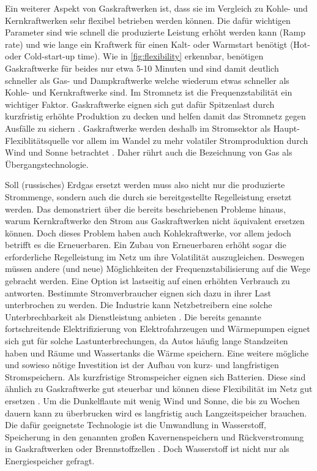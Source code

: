Ein weiterer Aspekt von Gaskraftwerken ist, dass sie im Vergleich zu Kohle- und Kernkraftwerken sehr flexibel betrieben werden können. Die dafür wichtigen Parameter sind wie schnell die produzierte Leistung erhöht werden kann (Ramp rate) und wie lange ein Kraftwerk für einen Kalt- oder Warmstart benötigt (Hot- oder Cold-start-up time). Wie in \autoref{fig:flexibility} erkennbar, benötigen Gaskraftwerke für beides nur etwa 5-10 Minuten und sind damit deutlich schneller als Gas- und Dampkraftwerke welche wiederum etwas schneller als Kohle- und Kernkraftwerke sind. Im Stromnetz ist die Frequenzstabilität ein wichtiger Faktor. Gaskraftwerke eignen sich gut dafür Spitzenlast durch kurzfristig erhöhte Produktion zu decken und helfen damit das Stromnetz gegen Ausfälle zu sichern \cite{ei1}.
Gaskraftwerke werden deshalb im Stromsektor als Haupt-Flexiblitätsquelle vor allem im Wandel zu mehr volatiler Stromproduktion durch Wind und Sonne betrachtet \cite{iea2022}. Daher rührt auch die Bezeichnung von Gas als Übergangstechnologie.

Soll (russisches) Erdgas ersetzt werden muss also nicht nur die produzierte Strommenge, sondern auch die durch sie bereitgestellte Regelleistung ersetzt werden. Das demonstriert über die bereits beschriebenen Probleme hinaus, warum Kernkraftwerke den Strom aus Gaskraftwerken nicht äquivalent ersetzen können.
Doch dieses Problem haben auch Kohlekraftwerke, vor allem jedoch betrifft es die Erneuerbaren. Ein Zubau von Erneuerbaren erhöht sogar die erforderliche Regelleistung im Netz um ihre Volatilität auszugleichen. Deswegen müssen andere (und neue) Möglichkeiten der Frequenzstabilisierung auf die Wege gebracht werden. 
Eine Option ist lastseitig auf einen erhöhten Verbrauch zu antworten. Bestimmte Stromverbraucher eignen sich dazu in ihrer Last unterbrochen zu werden. Die Industrie kann Netzbetreibern eine solche Unterbrechbarkeit als Dienstleistung anbieten \cite{ei1}. Die bereits genannte fortschreitende Elektrifizierung von Elektrofahrzeugen und Wärmepumpen eignet sich gut für solche Lastunterbrechungen, da Autos häufig lange Standzeiten haben und Räume und Wassertanks die Wärme speichern. Eine weitere mögliche und sowieso nötige Investition ist der Aufbau von kurz- und langfristigen Stromspeichern. Als kurzfristige Stromspeicher eignen sich Batterien. Diese sind ähnlich zu Gaskraftwerke gut steuerbar und können diese Flexibilität im Netz gut ersetzen \cite{clausen2022}. Um die Dunkelflaute mit wenig Wind und Sonne, die bis zu Wochen dauern kann zu überbrucken wird es langfristig auch Langzeitspeicher brauchen. Die dafür geeignetste Technologie ist die Umwandlung in Wasserstoff, Speicherung in den genannten großen Kavernenspeichern und Rückverstromung in Gaskraftwerken oder Brennstoffzellen \cite{leo}. Doch Wasserstoff ist nicht nur als Energiespeicher gefragt.

